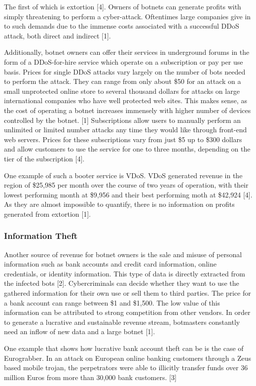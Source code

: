 The first of which is extortion [4]. Owners of botnets can generate profits with simply threatening to perform a cyber-attack. Oftentimes large companies give in to such demands due to the immense costs associated with a successful DDoS attack, both direct and indirect [1].

Additionally, botnet owners can offer their services in underground forums in the form of a DDoS-for-hire service which operate on a subscription or pay per use basis. Prices for single DDoS attacks vary largely on the number of bots needed to perform the attack. They can range from only about \$50 for an attack on a small unprotected online store to several thousand dollars for attacks on large international companies who have well protected web sites. This makes sense, as the cost of operating a botnet increases immensely with higher number of devices controlled by the botnet. [1] Subscriptions allow users to manually perform an unlimited or limited number attacks any time they would like through front-end web servers. Prices for these subscriptions vary from just \$5 up to \$300 dollars and allow customers to use the service for one to three months, depending on the tier of the subscription [4].

One example of such a booter service is VDoS. VDoS generated revenue in the region of \$25,985 per month over the course of two years of operation, with their lowest performing month at \$9,956 and their best performing moth at \$42,924 [4]. As they are almost impossible to quantify, there is no information on profits generated from extortion [1].

		\subsubsection{Information Theft}
		Another source of revenue for botnet owners is the sale and misuse of personal information such as bank accounts and credit card information, online credentials, or identity information. This type of data is directly extracted from the infected bots [2]. Cybercriminals can decide whether they want to use the gathered information for their own use or sell them to third parties. The price for a bank account can range between \$1 and \$1,500. The low value of this information can be attributed to strong competition from other vendors. In order to generate a lucrative and sustainable revenue stream, botmasters constantly need an inflow of new data and a large botnet [1].

One example that shows how lucrative bank account theft can be is the case of Eurograbber. In an attack on European online banking customers through a Zeus based mobile trojan, the perpetrators were able to illicitly transfer funds over 36 million Euros from more than 30,000 bank customers. [3]

